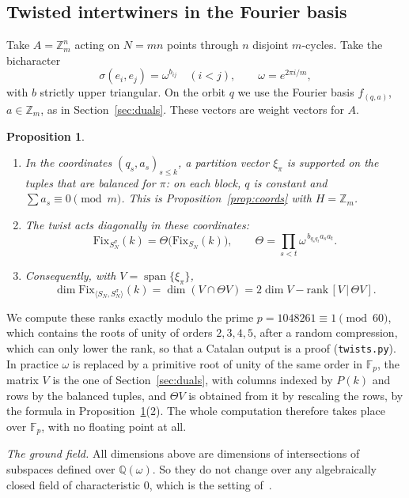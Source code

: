 \documentclass[11pt]{amsart}
\newtheorem{proposition}[theorem]{Proposition}
\theoremstyle{definition}
\theoremstyle{remark}
\theoremstyle{plain}
\numberwithin{equation}{section}
\numberwithin{table}{section}
\newcommand{\Z}{\mathbb Z}
\newcommand{\Fix}{\mathrm{Fix}}
\DeclareMathOperator{\spn}{span}
\begin{document}
\subsection{Twisted intertwiners in the Fourier basis}

Take $A=\Z_m^n$ acting on $N=mn$ points through $n$ disjoint $m$-cycles. Take the bicharacter
\[
\sigma(e_i,e_j)=\omega^{b_{ij}}\quad(i<j),\qquad \omega=e^{2\pi i/m},
\]
with $b$ strictly upper triangular. On the orbit $q$ we use the Fourier basis $f_{(q,a)}$, $a\in\Z_m$, as in Section~\ref{sec:duals}. These vectors are weight vectors for $A$.

\begin{proposition}\label{prop:J}
\begin{enumerate}
\item In the coordinates $(q_s,a_s)_{s\le k}$, a partition vector $\xi_\pi$ is supported on the tuples that are \emph{balanced} for $\pi$: on each block, $q$ is constant and $\sum a_s\equiv0\pmod m$. This is Proposition~\ref{prop:coords} with $H=\Z_m$.
\item The twist acts diagonally in these coordinates:
\[
\Fix_{S_N^\sigma}(k)=\Theta\big(\Fix_{S_N}(k)\big),\qquad \Theta=\prod_{s<t}\omega^{\,b_{q_sq_t}a_sa_t}.
\]
\item Consequently, with $V=\spn\{\xi_\pi\}$,
\[
\dim\Fix_{\langle S_N,S_N^\sigma\rangle}(k)=\dim(V\cap\Theta V)=2\dim V-\mathrm{rank}\,[V\,|\,\Theta V].
\]
\end{enumerate}
\end{proposition}

We compute these ranks exactly modulo the prime $p=1048261\equiv1\pmod{60}$, which contains the roots of unity of orders $2,3,4,5$, after a random compression, which can only lower the rank, so that a Catalan output is a proof (\texttt{twists.py}). In practice $\omega$ is replaced by a primitive root of unity of the same order in $\mathbb F_p$, the matrix $V$ is the one of Section~\ref{sec:duals}, with columns indexed by $P(k)$ and rows by the balanced tuples, and $\Theta V$ is obtained from it by rescaling the rows, by the formula in Proposition~\ref{prop:J}(2). The whole computation therefore takes place over $\mathbb F_p$, with no floating point at all.

\emph{The ground field.} All dimensions above are dimensions of intersections of subspaces defined over $\mathbb Q(\omega)$. So they do not change over any algebraically closed field of characteristic $0$, which is the setting of~\cite{bbn}.
\end{document}
